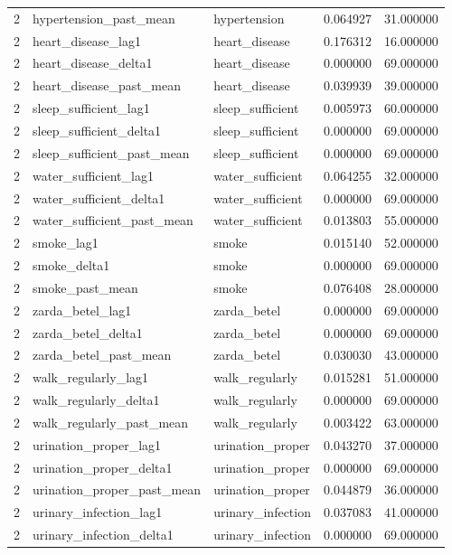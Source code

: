 \begin{longtable}{rllrr}
2 & hypertension\_past\_mean & hypertension & 0.064927 & 31.000000 \\
2 & heart\_disease\_lag1 & heart\_disease & 0.176312 & 16.000000 \\
2 & heart\_disease\_delta1 & heart\_disease & 0.000000 & 69.000000 \\
2 & heart\_disease\_past\_mean & heart\_disease & 0.039939 & 39.000000 \\
2 & sleep\_sufficient\_lag1 & sleep\_sufficient & 0.005973 & 60.000000 \\
2 & sleep\_sufficient\_delta1 & sleep\_sufficient & 0.000000 & 69.000000 \\
2 & sleep\_sufficient\_past\_mean & sleep\_sufficient & 0.000000 & 69.000000 \\
2 & water\_sufficient\_lag1 & water\_sufficient & 0.064255 & 32.000000 \\
2 & water\_sufficient\_delta1 & water\_sufficient & 0.000000 & 69.000000 \\
2 & water\_sufficient\_past\_mean & water\_sufficient & 0.013803 & 55.000000 \\
2 & smoke\_lag1 & smoke & 0.015140 & 52.000000 \\
2 & smoke\_delta1 & smoke & 0.000000 & 69.000000 \\
2 & smoke\_past\_mean & smoke & 0.076408 & 28.000000 \\
2 & zarda\_betel\_lag1 & zarda\_betel & 0.000000 & 69.000000 \\
2 & zarda\_betel\_delta1 & zarda\_betel & 0.000000 & 69.000000 \\
2 & zarda\_betel\_past\_mean & zarda\_betel & 0.030030 & 43.000000 \\
2 & walk\_regularly\_lag1 & walk\_regularly & 0.015281 & 51.000000 \\
2 & walk\_regularly\_delta1 & walk\_regularly & 0.000000 & 69.000000 \\
2 & walk\_regularly\_past\_mean & walk\_regularly & 0.003422 & 63.000000 \\
2 & urination\_proper\_lag1 & urination\_proper & 0.043270 & 37.000000 \\
2 & urination\_proper\_delta1 & urination\_proper & 0.000000 & 69.000000 \\
2 & urination\_proper\_past\_mean & urination\_proper & 0.044879 & 36.000000 \\
2 & urinary\_infection\_lag1 & urinary\_infection & 0.037083 & 41.000000 \\
2 & urinary\_infection\_delta1 & urinary\_infection & 0.000000 & 69.000000 \\

\end{longtable}
